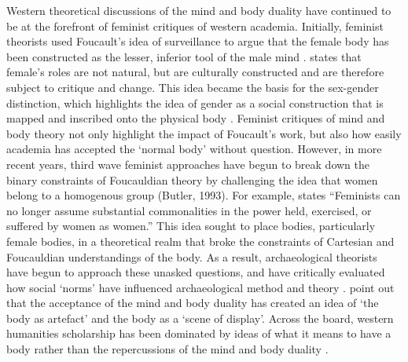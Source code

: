 	Western theoretical discussions of the mind and body duality have continued to be at the forefront of feminist critiques of western academia. Initially, feminist theorists used Foucault’s idea of surveillance to argue that the female body has been constructed as the lesser, inferior tool of the male mind \parencite{Butler_1990}. \textcite [1] {Cranny-Francis_1995} states that female’s roles are not natural, but are culturally constructed and are therefore subject to critique and change. This idea became the basis for the sex-gender distinction, which highlights the idea of gender as a social construction that is mapped and inscribed onto the physical body \parencite [2]{Cranny-Francis_1995}. Feminist critiques of mind and body theory not only highlight the impact of Foucault’s work, but also how easily academia has accepted the ‘normal body’ without question. However, in more recent years, third wave feminist approaches have begun to break down the binary constraints of Foucauldian theory by challenging the idea that women belong to a homogenous group (Butler, 1993). For example, \textcite [59]{Wylie_1992}  states “Feminists can no longer assume substantial commonalities in the power held, exercised, or suffered by women as women.” This idea sought to place bodies, particularly female bodies, in a theoretical realm that broke the constraints of Cartesian and Foucauldian understandings of the body.  As a result, archaeological theorists have begun to approach these unasked questions, and have critically evaluated how social ‘norms’ have influenced archaeological method and theory \parencites{Insoll_2007}{Yates_1993}. 
	\textcite [4]{Boric_2008} point out that the acceptance of the mind and body duality has created an idea of ‘the body as artefact’ and the body as a ‘scene of display’. Across the board, western humanities scholarship has been dominated by ideas of what it means to have a body rather than the repercussions of the mind and body duality \parencite[146]{Shilling_2008}.

